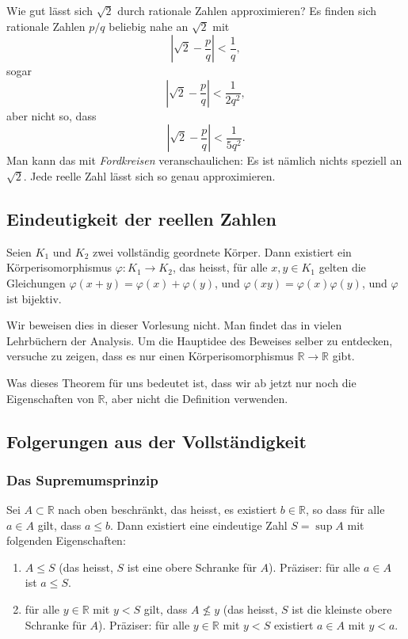\documentclass[../main.tex]{subfiles}
\begin{document}
\begin{einschub}
  Wie gut lässt sich $\sqrt 2$ durch rationale Zahlen
  approximieren? Es finden sich rationale Zahlen $p/q$ beliebig
  nahe an $\sqrt 2$ mit
  \[
    \left\vert \sqrt 2 - \frac{p}{q} \right\vert < \frac{1}{q},
  \]
  sogar
  \[
    \left\vert \sqrt 2 - \frac{p}{q} \right\vert < \frac{1}{2q^2},
  \]
  aber nicht so, dass
  \[
    \left\vert \sqrt 2 - \frac{p}{q} \right\vert < \frac{1}{5q^2}.
  \]
  Man kann das mit \emph{Fordkreisen} veranschaulichen:
  Es ist nämlich nichts speziell an $\sqrt 2$. Jede reelle Zahl
  lässt sich so genau approximieren.
\end{einschub}

\subsection*{Eindeutigkeit der reellen Zahlen}
\begin{theorem}[Dedekind]
  Seien $K_1$ und $K_2$ zwei vollständig geordnete Körper.
  Dann existiert ein Körperisomorphismus
  $\varphi\colon K_1 \to K_2$, das heisst,
	   für alle $x, y \in K_1$ gelten die
     Gleichungen $\varphi(x+y)
		  = \varphi(x) + \varphi(y)$,
		  und $\varphi(xy) = \varphi(x)\varphi(y)$,
	und $\varphi$ ist bijektiv.
\end{theorem}
Wir beweisen dies in dieser Vorlesung nicht.
Man findet das in vielen Lehrbüchern der Analysis.
Um die Hauptidee des Beweises selber zu entdecken,
versuche zu zeigen, dass es nur einen Körperisomorphismus
$\mathbb{R} \to \mathbb{R}$ gibt.

Was dieses Theorem für uns bedeutet ist, dass wir ab jetzt
nur noch die Eigenschaften von $\mathbb{R}$, aber nicht
die Definition verwenden.

\subsection*{Folgerungen aus der Vollständigkeit}
\subsubsection*{Das Supremumsprinzip}
\begin{supremum}
Sei $A \subset \mathbb{R}$ nach oben beschränkt,
das heisst, es existiert $b \in \mathbb{R}$, so dass
für alle $a \in A$ gilt, dass $a \leq b$.
Dann existiert eine eindeutige Zahl $S = \sup A$
mit folgenden Eigenschaften:
\begin{enumerate}[\normalfont(i)]
	\item $A \leq S$ (das heisst, $S$ ist eine obere Schranke
		für $A$). Präziser: für alle $a \in A$
		ist $a \leq S$.
  \item für alle $y \in \mathbb{R}$ mit $y < S$ gilt,
	  dass $A \not \leq y$ (das heisst, $S$ ist die kleinste
	  obere Schranke für $A$). Präziser: für alle $y \in \mathbb{R}$
	  mit $y < S$ existiert $a \in A$ mit $y < a$.
\end{enumerate}
\end{supremum}
\end{document}
